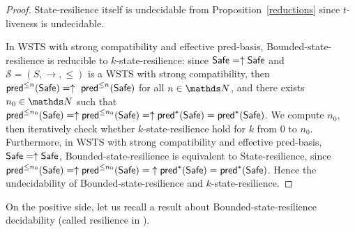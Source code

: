 \begin{proof}
{\sc State-resilience} itself is undecidable from Proposition~\ref{reductions} since 
{\sc %
$t$-liveness} is undecidable.


In WSTS with strong compatibility and effective pred-basis, {\sc Bounded-state-resilience} is
reducible to {\sc $k$-state-resilience}:
% 
since $\Safe=\uparrow \Safe$ and
$\mathscr{S}=(S,\rightarrow,\leq)$ is a WSTS with strong %
compatibility, then $\textsf{pred}^{\leq n}(\textsf{Safe})= \uparrow~\textsf{pred}^{\leq n}(\textsf{Safe})$ for all $n \in \N$,
and there exists $n_0 \in \N$ such that 
$\textsf{pred}^{\leq n_0}(\textsf{Safe}) = \uparrow \textsf{pred}^{\leq n_0}(\textsf{Safe}) = \uparrow \textsf{pred}^*(\textsf{Safe}) = \textsf{pred}^*(\textsf{Safe})$.
We compute 
$n_0$, then iteratively check whether $k$-state-resilience 
hold for $k$ from $0$ to $n_0$.  
Furthermore, in WSTS with strong compatibility and effective pred-basis,  $\Safe=\uparrow \Safe$, {\sc Bounded-state-resilience} is equivalent to {\sc State-resilience},
%
since 
$\textsf{pred}^{\leq n_0}(\textsf{Safe}) = \uparrow \textsf{pred}^{\leq n_0}(\textsf{Safe}) = {\uparrow \textsf{pred}^*(\textsf{Safe})} = \textsf{pred}^*(\textsf{Safe})$.
Hence the %
 undecidability of {\sc Bounded-state-resilience}
and 
 {\sc $k$-state-resilience}.
%
%
\iffalse
Bounded state-resilience and 
$k$ state-resilience are undecidable for strongly compatible WSTS with effective pred-basis
when
$\Safe=\uparrow \Safe$
and $\Bad=\downarrow \Bad$.
\fi
%
\end{proof}






On the positive side, let us recall a result about {\sc Bounded-state-resilience} decidability (called resilience in \cite{DBLP:conf/gg/Ozkan22,DBLP:journals/corr/abs-2108-00889}).

